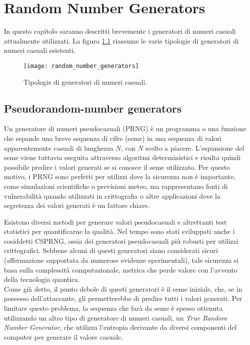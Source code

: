 \chapter{Random Number Generators}
In questo capitolo saranno descritti brevemente i generatori di numeri casuali attualmente utilizzati.
La figura \ref{random_number_generators} riassume le varie tipologie di generatori di numeri casuali esistenti.

\begin{figure}[h]
    \centering
    \texttt{[image: random\_number\_generators]}
    \caption{Tipologie di generatori di numeri casuali.}
    \label{random_number_generators}
\end{figure}

\section{Pseudorandom-number generators}
Un generatore di numeri pseudocasuali (PRNG) è un programma o una funzione che espande una breve sequenza di cifre (seme) in una sequenza di valori apparentemente casuali di lunghezza $N$, con $N$ scelto a piacere. L'espansione del seme viene tuttavia eseguita attraverso algoritmi deterministici e risulta quindi possibile predire i valori generati se si conosce il seme utilizzato. Per questo motivo, i PRNG sono perfetti per utilizzi dove la sicurezza non è importante, come simulazioni scientifiche o previsioni meteo, ma rappresentano fonti di vulnerabilità quando utilizzati in crittografia o altre applicazioni dove la segretezza dei valori generati è un fattore chiave. 

Esistono diversi metodi per generare valori pseudocasuali e altrettanti test statistici per quantificarne la qualità. Nel tempo sono stati sviluppati anche i cosiddetti CSPRNG, ossia dei generatori pseudocasuali più robusti per utilizzi crittografici. Sebbene alcuni di questi generatori siano considerati sicuri (affermazione supportata da numerose evidenze sperimentali), tale sicurezza si basa sulla complessità computazionale, metrica che perde valore con l'avvento della tecnologia quantica.\\ Come già detto, il punto debole di questi generatori è il seme iniziale, che, se in possesso dell'attaccante, gli permetterebbe di predire tutti i valori generati. Per limitare questo problema, la sequenza che farà da seme è spesso ottenuta utilizzando un altro tipo di generatore di numeri casuali, un \textit{True Random Number Generator}, che utilizza l'entropia derivante da diversi componenti del computer per generare il valore casuale. 


